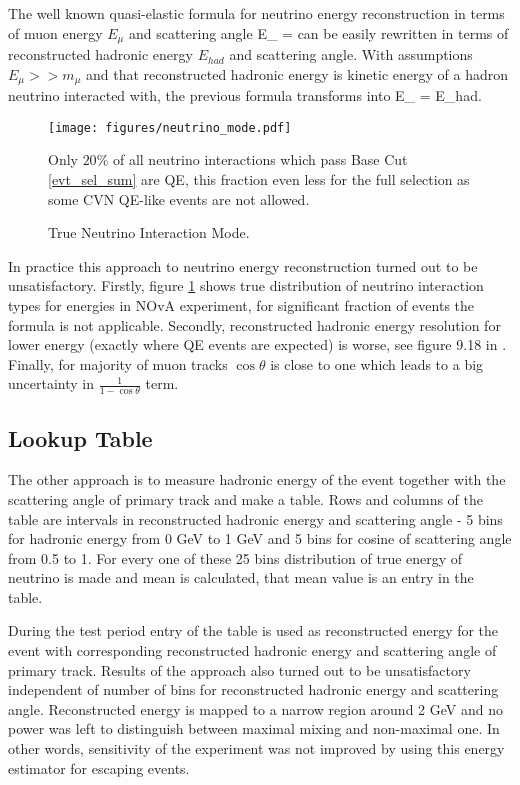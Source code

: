The well known quasi-elastic formula for neutrino energy reconstruction in terms of muon
energy $E_\mu$ and scattering angle %
\be
E_{\nu} = 
\ee
can be easily rewritten in terms of reconstructed hadronic energy $E_{had}$ and 
scattering angle. With assumptions $E_\mu >> m_\mu$ and that reconstructed hadronic 
energy is kinetic energy of a hadron neutrino interacted with, the previous formula 
transforms into
\be
E_{\nu} = E_{had}.
\ee
\begin{figure}[!th]
\centering
\texttt{[image: figures/neutrino\_mode.pdf]}
\caption{True Neutrino Interaction Mode.}
{Only $20\%$ of all neutrino interactions which pass Base Cut \ref{evt_sel_sum} are QE, this
fraction even less for the full selection as some CVN QE-like events are not allowed.}
\label{fig:trueInt}
\end{figure}

In practice this approach to neutrino energy reconstruction turned out to be unsatisfactory.
Firstly, figure \ref{fig:trueInt} shows true distribution of neutrino interaction types for
energies in NOvA experiment, for significant fraction of events the formula is not applicable. 
Secondly, reconstructed hadronic energy resolution for lower energy (exactly where QE
events are expected) is worse, see figure 9.18 in \cite{Susan}. Finally, for majority
of muon tracks $\cos\theta$ is close to one which leads to a big uncertainty in 
$\frac{1}{1-\cos\theta}$ term.

\subsection{Lookup Table}
The other approach is to measure hadronic energy of the event together with the scattering
angle of primary track and make a table. Rows and columns of the table are intervals in
reconstructed hadronic energy and scattering angle - 5 bins for hadronic energy from 0 GeV 
to 1 GeV and 5 bins for cosine of scattering angle from 0.5 to 1. For every one of these 25
bins distribution of true energy of neutrino is made and mean is calculated, that mean value
is an entry in the table.

During the test period entry of the table is used as reconstructed energy for the event
with corresponding reconstructed hadronic energy and scattering angle of primary track. 
Results of the approach also turned out to be unsatisfactory independent of number of bins
for reconstructed hadronic energy and scattering angle. Reconstructed energy is mapped to
a narrow region around 2 GeV and no power was left to distinguish between maximal mixing and
non-maximal one. In other words, sensitivity of the experiment was not improved by using 
this energy estimator for escaping events.

